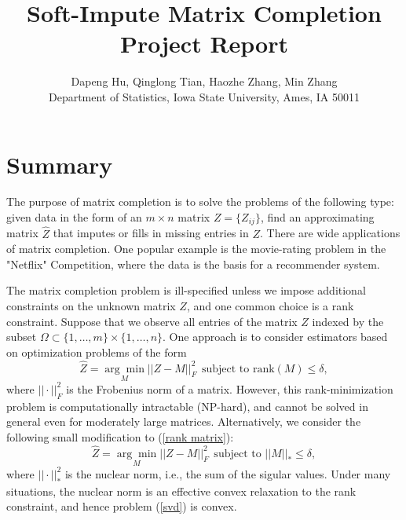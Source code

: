 \documentclass[12pt]{article}
\begin{document}
	
\author{Dapeng Hu, Qinglong Tian, Haozhe Zhang, Min Zhang\\
	Department of Statistics, Iowa State University, Ames, IA 50011\\}
\title{\bf Soft-Impute Matrix Completion Project Report}
\date{}
\maketitle

\section{Summary}
The purpose of matrix completion is to solve the problems of the following type: given data in the
form of an $m\times n$ matrix $Z = \{Z_{ij}\}$, find an approximating matrix $\widehat{Z}$ that imputes or fills in missing entries in $Z$. There are wide applications of matrix completion. One popular example is the movie-rating problem in the "Netflix" Competition, where the data is the basis for a recommender system.

The matrix completion problem is ill-specified
unless we impose additional constraints on the unknown matrix $Z$, and one
common choice is a rank constraint.  Suppose that we observe all entries of the matrix $Z$ indexed by the subset $\Omega \subset \{1, \ldots ,m\} \times \{1, \ldots, n\}$. One approach is to consider estimators based on optimization problems of the form
\begin{equation}\label{rank matrix}
\widehat{Z} = \underset{M}{\arg \min} ||Z-M||^{2}_{F} ~~\text{subject to rank}(M) \leq \delta,
\end{equation}
where $||\cdot||_{F}^{2}$ is the Frobenius norm of a matrix. However, this rank-minimization problem is computationally intractable (NP-hard), and cannot be solved in general even for moderately large matrices. Alternatively, we consider the following small modification to (\ref{rank matrix}):
\begin{equation}\label{svd}
\widehat{Z} = \underset{M}{\arg \min} ||Z-M||^{2}_{F} ~~\text{subject to }||M||_{*} \leq \delta,
\end{equation}
where $||\cdot||_{*}^{2}$ is the nuclear norm, i.e., the sum of the sigular values. Under many situations, the nuclear norm is an effective convex relaxation to the rank
constraint, and hence problem (\ref{svd}) is convex. 
\end{document}
